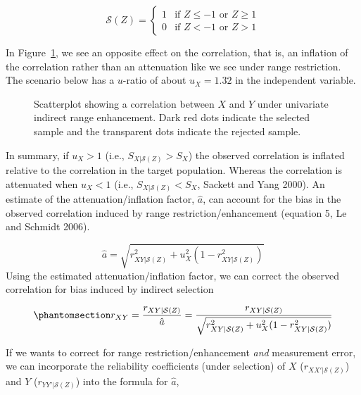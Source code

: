 \documentclass[
  letterpaper,
  DIV=11,
  numbers=noendperiod]{scrreprt}
\begin{document}
\[
\mathcal{S}(Z) = \begin{cases} 1 & \text{if } Z \leq -1 \text{ or } Z \geq 1 \\ 0 & \text{if } Z < -1 \text{ or } Z >1 \end{cases}
\]

In Figure~\ref{fig-uvire}, we see an opposite effect on the correlation,
that is, an inflation of the correlation rather than an attenuation like
we see under range restriction. The scenario below has a \(u\)-ratio of
about \(u_X=1.32\) in the independent variable.

\begin{figure}[H]


\caption{\label{fig-uvire}Scatterplot showing a correlation between
\(X\) and \(Y\) under univariate indirect range enhancement. Dark red
dots indicate the selected sample and the transparent dots indicate the
rejected sample.}

\end{figure}%

In summary, if \(u_X>1\) (i.e., \(S_{X|\mathcal{S}(Z)}>S_{X}\)) the
observed correlation is inflated relative to the correlation in the
target population. Whereas the correlation is attenuated when \(u_X<1\)
(i.e., \(S_{X|\mathcal{S}(Z)}<S_{X}\), Sackett and Yang 2000). An
estimate of the attenuation/inflation factor, \(\hat{a}\), can account
for the bias in the observed correlation induced by range
restriction/enhancement (equation 5, Le and Schmidt 2006).

\[
\hat{a} = \sqrt{r_{XY|\mathcal{S}(Z)}^2 + u_{X}^2 (1- r_{XY|\mathcal{S}(Z)}^2)  }
\] Using the estimated attenuation/inflation factor, we can correct the
observed correlation for bias induced by indirect selection

\begin{equation}\phantomsection\label{eq-univariate}{
r_{XY} = \frac{r_{XY|\mathcal{S}(Z)}}{\hat{a}} = \frac{r_{XY|\mathcal{S}(Z)}}{\sqrt{r_{XY|\mathcal{S}(Z)}^2 + u_{X}^2 (1- r_{XY|\mathcal{S}(Z)}^2)  }}
}\end{equation}

If we wants to correct for range restriction/enhancement \emph{and}
measurement error, we can incorporate the reliability coefficients
(under selection) of \(X\) (\(r_{XX'|\mathcal{S}(Z)}\)) and \(Y\)
(\(r_{YY'|\mathcal{S}(Z)}\)) into the formula for \(\hat{a}\),
\end{document}
